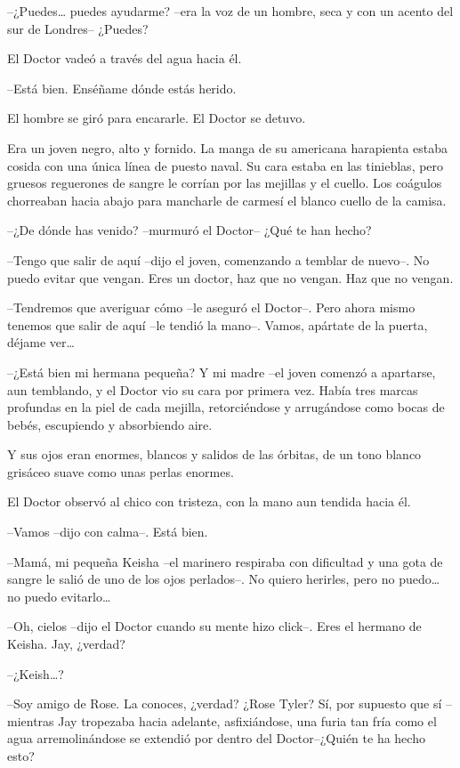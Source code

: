 {--¿Puedes\ldots{} puedes ayudarme? --era la voz de un hombre, seca y
con un acento del sur de Londres-- ¿Puedes?}

{El Doctor vadeó a través del agua hacia él.}

{--Está bien. Enséñame dónde estás herido.}

{El hombre se giró para encararle. El Doctor se detuvo.}

{Era un joven negro, alto y fornido. La manga de su americana harapienta
 estaba cosida con una única línea de puesto naval. Su cara estaba en las
 tinieblas, pero gruesos reguerones de sangre le corrían por las mejillas
 y el cuello. Los coágulos chorreaban hacia abajo para mancharle de
carmesí el blanco cuello de la camisa.}

{--¿De dónde has venido? --murmuró el Doctor-- ¿Qué te han hecho?}

{--Tengo que salir de aquí --dijo el joven, comenzando a temblar de
 nuevo--. No puedo evitar que vengan. Eres un doctor, haz que no vengan.
Haz que no vengan.}

{--Tendremos que averiguar cómo --le aseguró el Doctor--. Pero ahora
 mismo tenemos que salir de aquí --le tendió la mano--. Vamos, apártate
 de la puerta, déjame ver\ldots{}}

{--¿Está bien mi hermana pequeña? Y mi madre --el joven comenzó a
 apartarse, aun temblando, y el Doctor vio su cara por primera vez. Había
 tres marcas profundas en la piel de cada mejilla, retorciéndose y
arrugándose como bocas de bebés, escupiendo y absorbiendo aire.}

{Y sus ojos eran enormes, blancos y salidos de las órbitas, de un tono
blanco grisáceo suave como unas perlas enormes.}

{El Doctor observó al chico con tristeza, con la mano aun tendida hacia
él.}

{--Vamos --dijo con calma--. Está bien.}

{--Mamá, mi pequeña Keisha --el marinero respiraba con dificultad y una
 gota de sangre le salió de uno de los ojos perlados--. No quiero
 herirles, pero no puedo\ldots{} no puedo evitarlo\ldots{}}

{--Oh, cielos --dijo el Doctor cuando su mente hizo click--. Eres el
hermano de Keisha. Jay, ¿verdad?}

{--¿Keish\ldots{}?}

{--Soy amigo de Rose. La conoces, ¿verdad? ¿Rose Tyler? Sí, por supuesto
 que sí --mientras Jay tropezaba hacia adelante, asfixiándose, una furia
 tan fría como el agua arremolinándose se extendió por dentro del
Doctor--¿Quién te ha hecho esto?}

